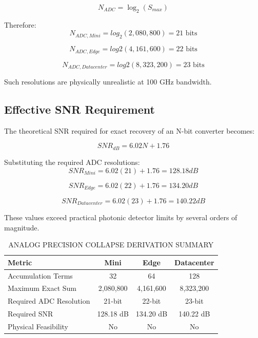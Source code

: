 \documentclass[journal]{IEEEtran}
\begin{document}
\begin{equation}
N_{ADC} = \log_{2}(S_{max})
\end{equation}

Therefore:
\begin{equation}
N_{ADC,Mini} = log_2(2,080,800) = 21\text{ bits}
\end{equation}

\begin{equation}
N_{ADC,Edge} = log2(4,161,600) = 22\text{ bits}
\end{equation}

\begin{equation}
N_{ADC,Datacenter} = log2(8,323,200) = 23\text{ bits}
\end{equation}

Such resolutions are physically unrealistic at 100 GHz bandwidth.

\subsection{\textbf{Effective SNR Requirement}}

The theoretical SNR required for exact recovery of an N-bit converter becomes:

\begin{equation}
SNR_{dB} = 6.02N + 1.76
\end{equation}

Substituting the required ADC resolutions:
\begin{equation}
SNR_{Mini} = 6.02(21) + 1.76 = 128.18 dB
\end{equation}

\begin{equation}
SNR_{Edge} = 6.02(22) + 1.76 = 134.20 dB
\end{equation}

\begin{equation}
SNR_{Datacenter} = 6.02(23) + 1.76 = 140.22 dB
\end{equation}

These values exceed practical photonic detector limits by several orders of magnitude.

\begin{table}[htbp]
\centering
\small
\setlength{\tabcolsep}{3pt}
\caption{ANALOG PRECISION COLLAPSE DERIVATION SUMMARY}
\label{tab:table21}
\begin{tabular}{lccc}
\toprule
Metric & Mini & Edge & Datacenter \\
\midrule
Accumulation Terms & 32 & 64 & 128 \\
Maximum Exact Sum & 2,080,800 & 4,161,600 & 8,323,200 \\
Required ADC Resolution & 21-bit & 22-bit & 23-bit \\
Required SNR & 128.18 dB & 134.20 dB & 140.22 dB \\
Physical Feasibility & No & No & No \\
\bottomrule
\end{tabular}
\end{table}
\end{document}
